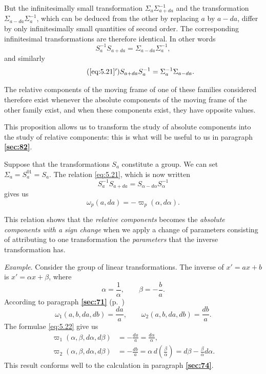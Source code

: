 \documentclass[leqno,11pt]{book}
\numberwithin{equation}{chapter}
\theoremstyle{shape1}
\theoremstyle{shapesmall}
\newcommand{\fsref}[1]{{\rm\textsection\textbf{\ref{sec:#1}}}}
\newcommand{\vp}{\varpi}
\newcommand{\somespace}{\vspace{9pt}}
\begin{document}
But the infinitesimally small transformation $\Sigma_{a}\Sigma_{a+da}^{-1}$ and the transformation $\Sigma_{a-da}\Sigma_{a}^{-1}$, which can be deduced from the other by replacing $a$ by $a-da$, differ by only infinitesimally small quantities of second order. The corresponding infinitesimal transformations are therefore identical. In other words
\begin{equation}
  \label{eq:5.21}
  S_{a}^{-1}S_{a+da}=\Sigma_{a-da}\Sigma_{a}^{-1},
\end{equation}
and similarly
\begin{equation}
  \label{eq:5.21'}\tag{\ref{eq:5.21}$'$}
  S_{a+da}S_{a}^{-1}=\Sigma^{-1}_{a}\Sigma_{a-da}.
\end{equation}

The relative components of the moving frame of one of these families considered therefore exist whenever the absolute components of the moving frame of the other family exist, and when these components exist, they have opposite values.

This proposition allows us to transform the study of absolute components into the study of relative components: this is what will be useful to us in paragraph \fsref{82}.

Suppose that the transformations $S_{a}$ constitute a group. We can set $\Sigma_{a}=S_{a}^{01}=S_{a}$. The relation \eqref{eq:5.21}, which is now written
\[
S_{a}^{-1}S_{a+da}=S_{\alpha-d\alpha}S_{\alpha}^{-1}
\]
gives us
\begin{equation}
  \label{eq:5.22}
  \omega_{p}(a,da)=-\vp_{p}(\alpha,d\alpha).
\end{equation}

This relation shows that the \emph{relative components} becomes the \emph{absolute components with a sign change} when we apply a change of parameters consisting of attributing to one transformation the \emph{parameters} that the inverse transformation has.

\somespace

{\small
\emph{Example}. Consider the group of linear transformations. The inverse of $x'=ax+b$ is $x'=\alpha x+\beta$, where
\[
\alpha=\frac{1}{\alpha},\qquad \beta=-\frac{b}{a}.
\]
According to paragraph \fsref{71} (p.~\pageref{sec:71})
\[
\omega_{1}(a,b,da,db)=\frac{da}{a},\qquad \omega_{2}(a,b,da,db)=\frac{db}{a}.
\]
The formulae \eqref{eq:5.22} give us
\begin{align*}
  \vp_{1}(\alpha,\beta,d\alpha,d\beta)&=-\frac{da}{a}=\frac{d\alpha}{\alpha},\\
  \vp_{2}(\alpha,\beta,d\alpha,d\beta)&=-\frac{db}{a}=\alpha\,d\left(\frac{\beta}{\alpha}\right)=d\beta-\frac{\beta}{\alpha}d\alpha.
\end{align*}
This result conforms well to the calculation in paragraph \fsref{74}.
}
\end{document}
